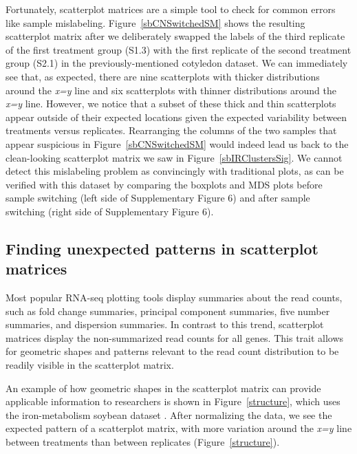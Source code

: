 \documentclass{bioinfo}
\begin{document}
Fortunately, scatterplot matrices are a simple tool to check for common errors like sample mislabeling. Figure~\ref{sbCNSwitchedSM} shows the resulting scatterplot matrix after we deliberately swapped the labels of the third replicate of the first treatment group (S1.3) with the first replicate of the second treatment group (S2.1) in the previously-mentioned cotyledon dataset. We can immediately see that, as expected, there are nine scatterplots with thicker distributions around the \textit{x=y} line and six scatterplots with thinner distributions around the \textit{x=y} line. However, we notice that a subset of these thick and thin scatterplots appear outside of their expected locations given the expected variability between treatments versus replicates. Rearranging the columns of the two samples that appear suspicious in Figure~\ref{sbCNSwitchedSM} would indeed lead us back to the clean-looking scatterplot matrix we saw in Figure~\ref{sbIRClustersSig}. We cannot detect this mislabeling problem as convincingly with traditional plots, as can be verified with this dataset by comparing the boxplots and MDS plots before sample switching (left side of Supplementary Figure 6) and after sample switching (right side of Supplementary Figure 6). 

\subsection{Finding unexpected patterns in scatterplot matrices}

Most popular RNA-seq plotting tools display summaries about the read counts, such as fold change summaries, principal component summaries, five number summaries, and dispersion summaries. In contrast to this trend, scatterplot matrices display the non-summarized read counts for all genes. This trait allows for geometric shapes and patterns relevant to the read count distribution to be readily visible in the scatterplot matrix.

An example of how geometric shapes in the scatterplot matrix can provide applicable information to researchers is shown in Figure~\ref{structure}, which uses the iron-metabolism soybean dataset \citep{Lauter}. After normalizing the data, we see the expected pattern of a scatterplot matrix, with more variation around the \textit{x=y} line between treatments than between replicates (Figure~\ref{structure}). 
\end{document}
